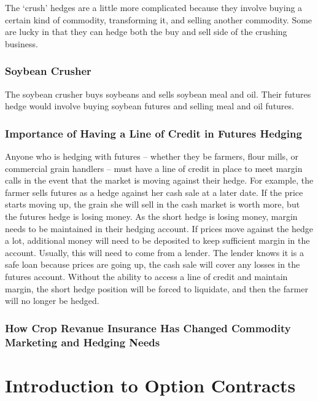 \documentclass[
  letterpaper,
  DIV=11,
  numbers=noendperiod]{scrreprt}
\begin{document}
The `crush' hedges are a little more complicated because they involve
buying a certain kind of commodity, transforming it, and selling another
commodity. Some are lucky in that they can hedge both the buy and sell
side of the crushing business.

\subsection{Soybean Crusher}\label{soybean-crusher}

The soybean crusher buys soybeans and sells soybean meal and oil. Their
futures hedge would involve buying soybean futures and selling meal and
oil futures.

\subsection{Importance of Having a Line of Credit in Futures
Hedging}\label{importance-of-having-a-line-of-credit-in-futures-hedging}

Anyone who is hedging with futures -- whether they be farmers, flour
mills, or commercial grain handlers -- must have a line of credit in
place to meet margin calls in the event that the market is moving
against their hedge. For example, the farmer sells futures as a hedge
against her cash sale at a later date. If the price starts moving up,
the grain she will sell in the cash market is worth more, but the
futures hedge is losing money. As the short hedge is losing money,
margin needs to be maintained in their hedging account. If prices move
against the hedge a lot, additional money will need to be deposited to
keep sufficient margin in the account. Usually, this will need to come
from a lender. The lender knows it is a safe loan because prices are
going up, the cash sale will cover any losses in the futures account.
Without the ability to access a line of credit and maintain margin, the
short hedge position will be forced to liquidate, and then the farmer
will no longer be hedged.

\subsection{How Crop Revanue Insurance Has Changed Commodity Marketing
and Hedging
Needs}\label{how-crop-revanue-insurance-has-changed-commodity-marketing-and-hedging-needs}


\chapter{Introduction to Option
Contracts}\label{introduction-to-option-contracts}
\end{document}
